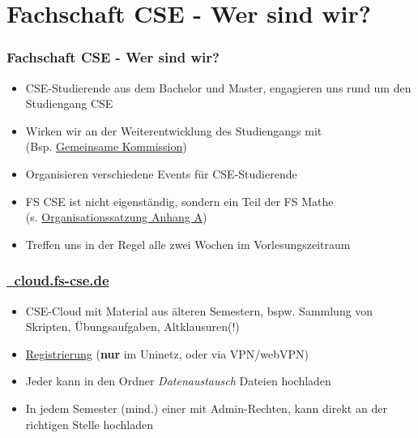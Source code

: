 \documentclass[10pt,a4paper]{beamer}
\begin{document}
    \section{Fachschaft CSE - Wer sind wir?}
    \begin{frame}
        \frametitle{Fachschaft CSE - Wer sind wir?}
        \begin{itemize}
            \setlength{\itemsep}{10pt} %
            \item CSE-Studierende aus dem Bachelor und Master, engagieren uns rund um den Studiengang CSE
            \item Wirken wir an der Weiterentwicklung des Studiengangs mit \\(Bsp. \href{https://www.uni-ulm.de/mawi/mawi-cse/gemeinsame-kommission-cse/}{\color{ecs100}Gemeinsame Kommission})
            \item Organisieren verschiedene Events für CSE-Studierende
            \item FS CSE ist nicht eigenständig, sondern ein Teil der FS Mathe \\(s. \href{https://stuve.uni-ulm.de/struktur/satzungen-ordnungen}{\color{ecs100}Organisationssatzung Anhang A})
            \item Treffen uns in der Regel alle zwei Wochen im Vorlesungszeitraum
        \end{itemize}
    \end{frame}
    
    \begin{frame}
        \frametitle{\href{http://cloud.fs-cse.de}{\Mundus~cloud.fs-cse.de}}
        \vfill
        \begin{itemize}
            \item CSE-Cloud mit Material aus älteren Semestern, bspw. Sammlung von Skripten, Übungsaufgaben, Altklausuren(!)
            \vfill
            \item \href{https://stuve.uni-ulm.de/fs-cse/fuer-cseler/cse-cloud}{\color{ecs100}Registrierung} (\textbf{nur} im Uninetz, oder via VPN/webVPN)
            \vfill
            \item Jeder kann in den Ordner \emph{Datenaustausch} Dateien hochladen
            \vfill
            \item In jedem Semester (mind.) einer mit Admin-Rechten, kann direkt an der richtigen Stelle hochladen
        \end{itemize}
        \vfill
    \end{frame}
\end{document}
